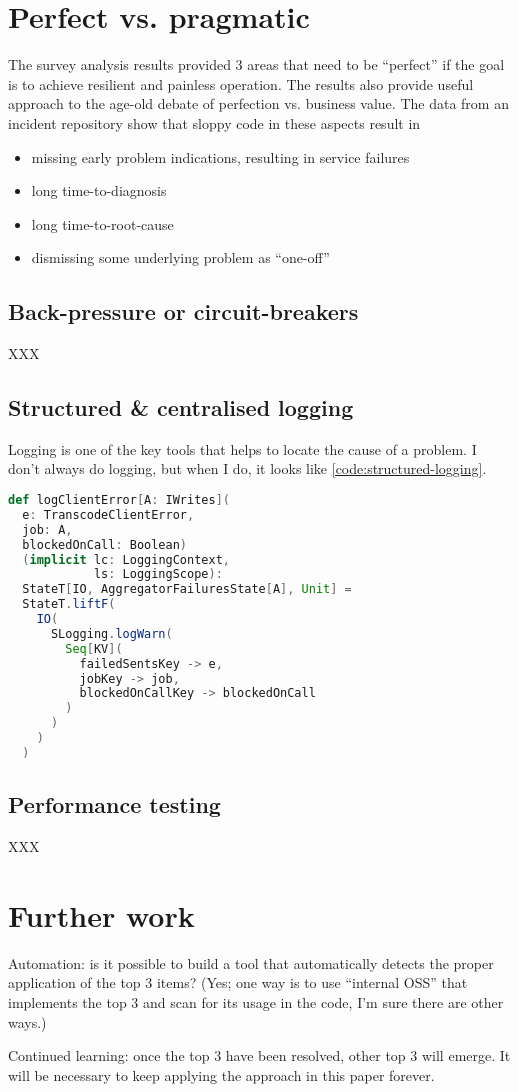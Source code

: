 \documentclass[10 pt, twocolumn]{article}
\begin{document}
\section{Perfect vs. pragmatic}
The survey analysis results provided 3 areas that need to be ``perfect'' if the goal is to achieve resilient and painless operation. The results also provide useful approach to the age-old debate of perfection vs. business value. The data from an incident repository show that sloppy code in these aspects result in

\begin{itemize}
\item missing early problem indications, resulting in service failures
\item long time-to-diagnosis
\item long time-to-root-cause 
\item dismissing some underlying problem as ``one-off''
\end{itemize}

\subsection{Back-pressure or circuit-breakers}
XXX

\subsection{Structured \& centralised logging}
Logging is one of the key tools that helps to locate the cause of a problem. I don't always do logging, but when I do, it looks like \autoref{code:structured-logging}.

\begin{lstlisting}[caption={Structured logging}, label={code:structured-logging}, language=Scala, escapechar=|]
def logClientError[A: IWrites](
  e: TranscodeClientError,
  job: A,
  blockedOnCall: Boolean)
  (implicit lc: LoggingContext, 
            ls: LoggingScope): 
  StateT[IO, AggregatorFailuresState[A], Unit] =
  StateT.liftF(
    IO(
      SLogging.logWarn(
        Seq[KV](
          failedSentsKey -> e,
          jobKey -> job,
          blockedOnCallKey -> blockedOnCall
        )
      )
    )
  )
\end{lstlisting}

\subsection{Performance testing}
XXX

\section{Further work}
Automation: is it possible to build a tool that automatically detects the proper application of the top 3 items? (Yes; one way is to use ``internal OSS'' that implements the top 3 and scan for its usage in the code, I'm sure there are other ways.)

Continued learning: once the top 3 have been resolved, other top 3 will emerge. It will be necessary to keep applying the approach in this paper forever.

\printbibliography
\end{document}
